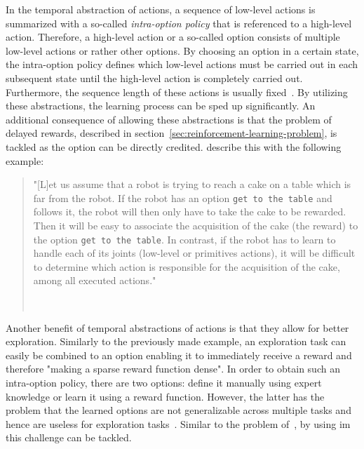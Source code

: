 \documentclass[draft,final]{vutinfth} %
\newcommand{\p}[1]{see p. #1}
\begin{document}
    In the temporal abstraction of actions, a sequence of low-level actions is summarized with a so-called \textit{intra-option policy} that is referenced to a high-level action.
    Therefore, a high-level action or a so-called option consists of multiple low-level actions or rather other options.
    By choosing an option in a certain state, the intra-option policy defines which low-level actions must be carried out in each subsequent state until the high-level action is completely carried out.
    Furthermore, the sequence length of these actions is usually fixed~\citep{aubret_survey_2019}.
    By utilizing these abstractions, the learning process can be sped up significantly.
    An additional consequence of allowing these abstractions is that the problem of delayed rewards, described in section~\ref{sec:reinforcement-learning-problem}, is tackled as the option can be directly credited.
    \citeauthor{aubret_survey_2019} describe this with the following example:

    \begin{quote}
        "[L]et us assume that a robot is trying to reach a cake on a table which is far from the robot.
        If the robot has an option \texttt{get to the table} and follows it, the robot will then only have to take the cake to be rewarded.
        Then it will be easy to associate the acquisition of the cake (the reward) to the option \texttt{get to the table}.
        In contrast, if the robot has to learn to handle each of its joints (low-level or primitives actions), it will be difficult to determine which action is responsible for the acquisition of the cake, among all executed actions."

        \hfill~\cite[\p{5f}]{aubret_survey_2019}
    \end{quote}

    Another benefit of temporal abstractions of actions is that they allow for better exploration.
    Similarly to the previously made example, an exploration task can easily be combined to an option enabling it to immediately receive a reward and therefore "making a sparse reward function dense".
    In order to obtain such an intra-option policy, there are two options: define it manually using expert knowledge or learn it using a reward function.
    However, the latter has the problem that the learned options are not generalizable across multiple tasks and hence are useless for exploration tasks~\citep{aubret_survey_2019}.
    Similar to the problem of~, by using \gls{im} this challenge can be tackled.
\end{document}
